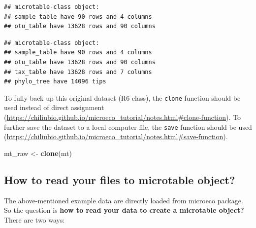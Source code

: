 \documentclass[
]{book}
\newenvironment{Shaded}{\begin{snugshade}}{\end{snugshade}}
\newcommand{\AttributeTok}[1]{\textcolor[rgb]{0.13,0.29,0.53}{#1}}
\newcommand{\CommentTok}[1]{\textcolor[rgb]{0.56,0.35,0.01}{\textit{#1}}}
\newcommand{\FunctionTok}[1]{\textcolor[rgb]{0.13,0.29,0.53}{\textbf{#1}}}
\newcommand{\NormalTok}[1]{#1}
\newcommand{\OtherTok}[1]{\textcolor[rgb]{0.56,0.35,0.01}{#1}}
\newcommand{\SpecialCharTok}[1]{\textcolor[rgb]{0.81,0.36,0.00}{\textbf{#1}}}
\begin{document}
\begin{verbatim}
## microtable-class object:
## sample_table have 90 rows and 4 columns
## otu_table have 13628 rows and 90 columns
\end{verbatim}

\begin{Shaded}
\end{Shaded}

\begin{verbatim}
## microtable-class object:
## sample_table have 90 rows and 4 columns
## otu_table have 13628 rows and 90 columns
## tax_table have 13628 rows and 7 columns
## phylo_tree have 14096 tips
\end{verbatim}

To fully back up this original dataset (R6 class), the \texttt{clone} function should be used instead of direct assignment (\url{https://chiliubio.github.io/microeco_tutorial/notes.html\#clone-function}).
To further save the dataset to a local computer file, the \texttt{save} function should be used (\url{https://chiliubio.github.io/microeco_tutorial/notes.html\#save-function}).

\begin{Shaded}
\begin{Highlighting}[]
\NormalTok{mt\_raw }\OtherTok{\textless{}{-}} \FunctionTok{clone}\NormalTok{(mt)}
\end{Highlighting}
\end{Shaded}

\subsection{How to read your files to microtable object?}\label{how-to-read-your-files-to-microtable-object}

The above-mentioned example data are directly loaded from microeco package.
So the question is \textbf{how to read your data to create a microtable object?}\\
There are two ways:
\end{document}
